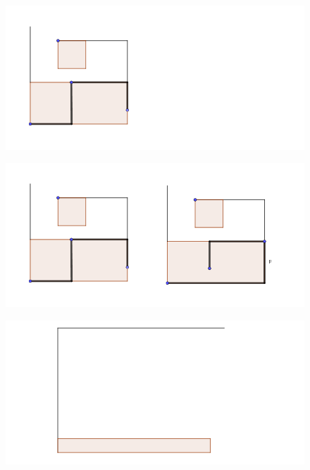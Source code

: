 \documentclass{beamer}
\begin{document}
\begin{frame}
\begin{figure}[h]
\includegraphics[width=\textwidth]{Cajas-3-puntos-no-puede-2}
\end{figure}
\end{frame}
\begin{frame}
\begin{figure}[h]
\includegraphics[width=\textwidth]{Cajas-3-puntos-no-puede-3}
\end{figure}
\end{frame}
\begin{frame}
\begin{figure}[h]
\includegraphics[width=\textwidth]{Caso-de-n-cuartos-steiner}
\end{figure}
\end{frame}
\end{document}
